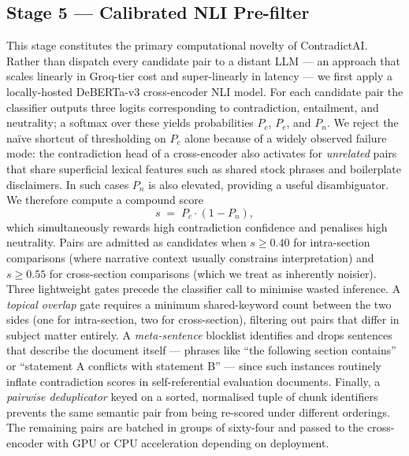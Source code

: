 \documentclass[conference]{IEEEtran}
\begin{document}
\subsection{Stage 5 --- Calibrated NLI Pre-filter}
This stage constitutes the primary computational novelty of ContradictAI. Rather than dispatch every candidate pair to a distant LLM --- an approach that scales linearly in Groq-tier cost and super-linearly in latency --- we first apply a locally-hosted DeBERTa-v3 cross-encoder NLI model. For each candidate pair the classifier outputs three logits corresponding to contradiction, entailment, and neutrality; a softmax over these yields probabilities $P_c$, $P_e$, and $P_n$. We reject the na\"{i}ve shortcut of thresholding on $P_c$ alone because of a widely observed failure mode: the contradiction head of a cross-encoder also activates for \emph{unrelated} pairs that share superficial lexical features such as shared stock phrases and boilerplate disclaimers. In such cases $P_n$ is also elevated, providing a useful disambiguator. We therefore compute a compound score
\begin{equation}
s \;=\; P_c \cdot (1 - P_n),
\label{eq:score}
\end{equation}
which simultaneously rewards high contradiction confidence and penalises high neutrality. Pairs are admitted as candidates when $s \geq 0.40$ for intra-section comparisons (where narrative context usually constrains interpretation) and $s \geq 0.55$ for cross-section comparisons (which we treat as inherently noisier).
Three lightweight gates precede the classifier call to minimise wasted inference. A \emph{topical overlap} gate requires a minimum shared-keyword count between the two sides (one for intra-section, two for cross-section), filtering out pairs that differ in subject matter entirely. A \emph{meta-sentence} blocklist identifies and drops sentences that describe the document itself --- phrases like ``the following section contains'' or ``statement A conflicts with statement B'' --- since such instances routinely inflate contradiction scores in self-referential evaluation documents. Finally, a \emph{pairwise deduplicator} keyed on a sorted, normalised tuple of chunk identifiers prevents the same semantic pair from being re-scored under different orderings. The remaining pairs are batched in groups of sixty-four and passed to the cross-encoder with GPU or CPU acceleration depending on deployment.
\end{document}
